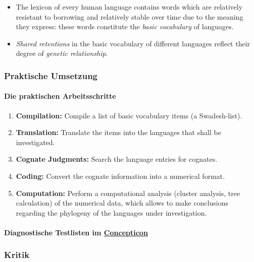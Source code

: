 \begin{itemize}
\item
  The lexicon of every human language contains words which are
  relatively resistant to borrowing and relatively stable over time due
  to the meaning they express: these words constitute the \emph{basic
  vocabulary} of languages.
\item
  \emph{Shared retentions} in the basic vocabulary of different
  languages reflect their degree of \emph{genetic relationship}.
\end{itemize}



\subsubsection{\texorpdfstring{{Praktische
Umsetzung}}{Praktische Umsetzung}}

\paragraph{Die praktischen Arbeitsschritte}

\begin{enumerate}
\itemsep1pt\parskip0pt
\item
  \textbf{Compilation:} Compile a list of basic vocabulary items (a
  Swadesh-list).
\item
  \textbf{Translation:} Translate the items into the languages that
  shall be investigated.
\item
  \textbf{Cognate Judgments:} Search the language entries for cognates.
\item
  \textbf{Coding:} Convert the cognate information into a numerical
  format.
\item
  \textbf{Computation:} Perform a computational analysis (cluster
  analysis, tree calculation) of the numerical data, which allows to
  make conclusions regarding the phylogeny of the languages under
  investigation.
\end{enumerate}



\paragraph{Diagnostische Testlisten im
\href{http://concepticon.clld.org}{Concepticon}}



\subsubsection{\texorpdfstring{{Kritik}}{Kritik}}

